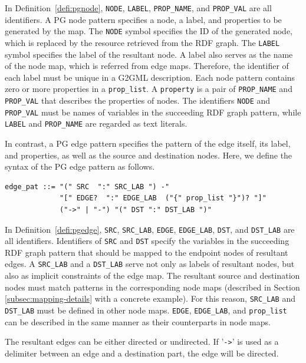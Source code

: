 \documentclass[runningheads]{llncs}
\begin{document}
In Definition~\ref{defi:pgnode}, \texttt{NODE}, \texttt{LABEL}, \texttt{PROP\_NAME}, and \texttt{PROP\_VAL} are all identifiers.
A PG node pattern specifies a node, a label, and properties to be generated by the map. The \texttt{NODE} symbol specifies the ID of the generated node, which is replaced by the resource retrieved from the RDF graph. The \texttt{LABEL} symbol specifies the label of the resultant node. A label also serves as the name of the node map, which is referred from edge maps.
Therefore, the identifier of each label must be unique in a G2GML description.
Each node pattern contains zero or more properties in a \texttt{prop\_list}.
A \texttt{property} is a pair of \texttt{PROP\_NAME} and \texttt{PROP\_VAL} that describes the properties of nodes.
The identifiers \texttt{NODE} and \texttt{PROP\_VAL} must be names of variables in the succeeding RDF graph pattern, while \texttt{LABEL} and \texttt{PROP\_NAME} are regarded as text literals.
 
In contrast, a PG edge pattern specifies the pattern of the edge itself, its label, and properties, as well as the source and destination nodes.
Here, we define the syntax of the PG edge pattern as follows.
\begin{defi}
\label{defi:pgedge}
\leavevmode
\begin{verbatim}
edge_pat ::= "(" SRC  ":" SRC_LAB ") -" 
             "[" EDGE?  ":" EDGE_LAB  ("{" prop_list "}")? "]" 
             ("->" | "-") "(" DST ":" DST_LAB ")"
\end{verbatim}
\end{defi}

In Definition~\ref{defi:pgedge}, \texttt{SRC}, \texttt{SRC\_LAB}, \texttt{EDGE}, \texttt{EDGE\_LAB}, \texttt{DST}, and \texttt{DST\_LAB} are all identifiers. Identifiers of \texttt{SRC} and \texttt{DST} specify the variables in the succeeding RDF graph pattern that should be mapped to the endpoint nodes of resultant edges.
A \texttt{SRC\_LAB} and a \texttt{DST\_LAB} serve not only as labels of resultant nodes, but also as implicit constraints of the edge map. The resultant source and destination nodes must match patterns in the corresponding node maps (described in Section \ref{subsec:mapping-details} with a concrete example).
For this reason, \texttt{SRC\_LAB} and \texttt{DST\_LAB} must be defined in other node maps.
\texttt{EDGE}, \texttt{EDGE\_LAB}, and \texttt{prop\_list} can be described in the same manner as their counterparts in node maps.

The resultant edges can be either directed or undirected. If '\texttt{->}' is used as a delimiter between an edge and a destination part, the edge will be  directed.
\end{document}
